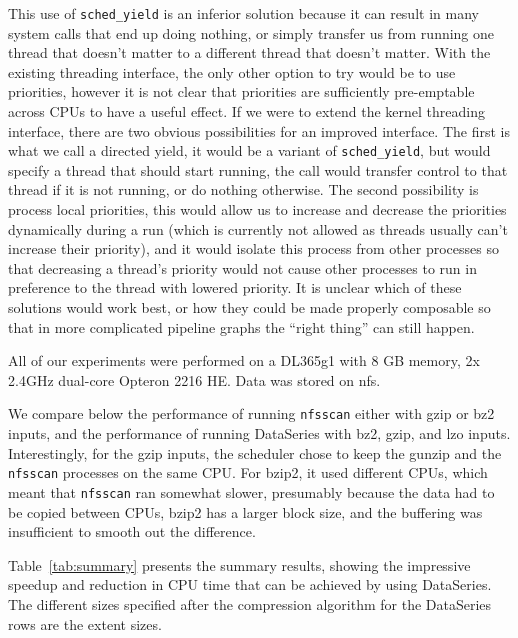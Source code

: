 This use of \texttt{sched\_yield} is an inferior solution because it
can result in many system calls that end up doing nothing, or simply
transfer us from running one thread that doesn't matter to a different
thread that doesn't matter.  With the existing threading interface,
the only other option to try would be to use priorities, however it is
not clear that priorities are sufficiently pre-emptable across CPUs to
have a useful effect.  If we were to extend the kernel threading
interface, there are two obvious possibilities for an improved
interface.  The first is what we call a directed yield, it would be a
variant of \texttt{sched\_yield}, but would specify a thread that should start
running, the call would transfer control to that thread if it is not
running, or do nothing otherwise.  The second possibility is process
local priorities, this would allow us to increase and decrease the
priorities dynamically during a run (which is currently not allowed as
threads usually can't increase their priority), and it would isolate
this process from other processes so that decreasing a thread's
priority would not cause other processes to run in preference to the
thread with lowered priority.  It is unclear which of these solutions
would work best, or how they could be made properly composable so that
in more complicated pipeline graphs the ``right thing'' can still
happen.

All of our experiments were performed on a DL365g1 with 8 GB memory, 2x
2.4GHz dual-core Opteron 2216 HE.  Data was stored on nfs.

We compare below the performance of running \texttt{nfsscan} either
with gzip or bz2 inputs, and the performance of running DataSeries
with bz2, gzip, and lzo inputs.  Interestingly, for the gzip inputs,
the scheduler chose to keep the gunzip and the \texttt{nfsscan}
processes on the same CPU.  For bzip2, it used different CPUs, which
meant that \texttt{nfsscan} ran somewhat slower, presumably because the
data had to be copied between CPUs, bzip2 has a larger block size, and
the buffering was insufficient to smooth out the difference.

Table~\ref{tab:summary} presents the summary results, showing the
impressive speedup and reduction in CPU time that can be achieved by
using DataSeries.  The different sizes specified after the compression
algorithm for the DataSeries rows are the extent sizes.

